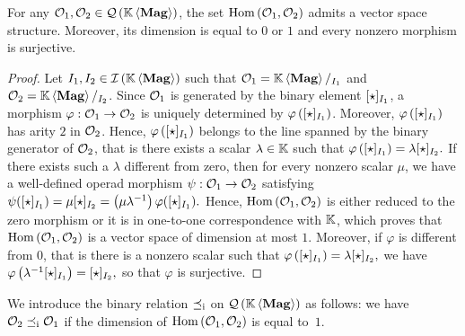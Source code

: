 \begin{Proposition} \label{prop:endomorphisms_of_magmatic_operads}
    For any $\mathcal{O}_1, \mathcal{O}_2 \in \mathcal{Q}\left(\mathbb{K} \left\langle\mathbf{Mag}\right\rangle\right)$, the set
    $\mathrm{Hom}\left(\mathcal{O}_1,\mathcal{O}_2\right)$ admits a vector space structure.
    Moreover, its dimension is equal to $0$ or $1$ and every nonzero
    morphism is surjective.
\end{Proposition}
\begin{proof}
    Let $I_1, I_2 \in \mathcal{I}\left(\mathbb{K} \left\langle\mathbf{Mag}\right\rangle\right)$ such that $\mathcal{O}_1 = \mathbb{K} \left\langle\mathbf{Mag}\right\rangle/_{I_1}$ and
    $\mathcal{O}_2 = \mathbb{K} \left\langle\mathbf{Mag}\right\rangle/_{I_2}$. Since $\mathcal{O}_1$ is generated by the binary
    element $[\operatorname{\star}]_{I_1}$, a morphism $\varphi:\mathcal{O}_1\to\mathcal{O}_2$ is
    uniquely determined by $\varphi\left([\operatorname{\star}]_{I_1}\right)$.
    Moreover, $\varphi\left([\operatorname{\star}]_{I_1}\right)$ has arity $2$ in
    $\mathcal{O}_2$. Hence, $\varphi\left([\operatorname{\star}]_{I_1}\right)$ belongs to
    the line spanned by the binary generator of $\mathcal{O}_2$, that is there
    exists a scalar $\lambda\in\mathbb{K}$ such that
    \begin{math}
        \varphi\left([\operatorname{\star}]_{I_1}\right)
        = \lambda[\operatorname{\star}]_{I_2}.
    \end{math}
    If there exists such a $\lambda$ different from zero, then for every
    nonzero scalar $\mu$, we have a well-defined operad morphism
    $\psi:\mathcal{O}_1\to\mathcal{O}_2$ satisfying
    \begin{math}
        \psi([\operatorname{\star}]_{I_1}) =\mu[\operatorname{\star}]_{I_2}
        = \left(\mu \lambda^{-1}\right)\varphi([\operatorname{\star}]_{I_1}).
    \end{math}
    Hence, $\mathrm{Hom}\left(\mathcal{O}_1,\mathcal{O}_2\right)$ is either reduced to the
    zero morphism or it is in one-to-one correspondence with $\mathbb{K}$, which
    proves that $\mathrm{Hom}\left(\mathcal{O}_1,\mathcal{O}_2\right)$ is a vector space of
    dimension at most $1$. Moreover, if $\varphi$ is different from $0$,
    that is there is a nonzero scalar such that
    \begin{math}
        \varphi\left([\operatorname{\star}]_{I_1}\right) = \lambda[\operatorname{\star}]_{I_2},
    \end{math}
    we have
    \begin{math}
        \varphi\left(\lambda^{-1}[\operatorname{\star}]_{I_1}\right)
        = [\operatorname{\star}]_{I_2},
    \end{math}
    so that $\varphi$ is surjective.
\end{proof}
\medbreak

We introduce the binary relation $\preceq_{\mathrm{i}}$ on $\mathcal{Q}\left(\mathbb{K} \left\langle\mathbf{Mag}\right\rangle\right)$ as follows: we
have $\mathcal{O}_2\preceq_{\mathrm{i}}\mathcal{O}_1$ if the dimension of
$\mathrm{Hom}\left(\mathcal{O}_1,\mathcal{O}_2\right)$ is equal to~$1$.
\medbreak

